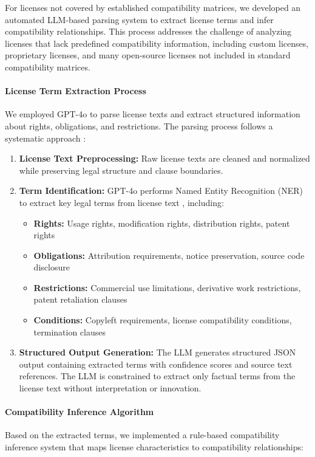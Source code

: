 For licenses not covered by established compatibility matrices, we developed an automated LLM-based parsing system to extract license terms and infer compatibility relationships. This process addresses the challenge of analyzing licenses that lack predefined compatibility information, including custom licenses, proprietary licenses, and many open-source licenses not included in standard compatibility matrices.

\paragraph{License Term Extraction Process}
We employed GPT-4o to parse license texts and extract structured information about rights, obligations, and restrictions. The parsing process follows a systematic approach \cite{wang2019glue}:

\begin{enumerate}
    \item \textbf{License Text Preprocessing:} Raw license texts are cleaned and normalized while preserving legal structure and clause boundaries.
    \item \textbf{Term Identification:} GPT-4o performs Named Entity Recognition (NER) to extract key legal terms from license text \cite{wang2022llmner,chen2023gptner,li2023legalner}, including:
    \begin{itemize}
        \item \textbf{Rights:} Usage rights, modification rights, distribution rights, patent rights
        \item \textbf{Obligations:} Attribution requirements, notice preservation, source code disclosure
        \item \textbf{Restrictions:} Commercial use limitations, derivative work restrictions, patent retaliation clauses
        \item \textbf{Conditions:} Copyleft requirements, license compatibility conditions, termination clauses
    \end{itemize}
    \item \textbf{Structured Output Generation:} The LLM generates structured JSON output containing extracted terms with confidence scores and source text references. The LLM is constrained to extract only factual terms from the license text without interpretation or innovation.
\end{enumerate}

\paragraph{Compatibility Inference Algorithm}
Based on the extracted terms, we implemented a rule-based compatibility inference system that maps license characteristics to compatibility relationships:

